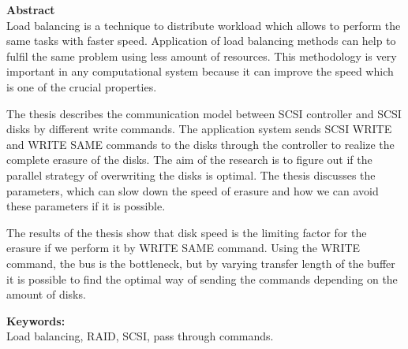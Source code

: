 {\bf Abstract}\\


Load balancing is a technique to distribute workload which allows to perform the same tasks with faster speed. Application of load balancing methods can help to fulfil the same problem using less amount of resources. This methodology is very important in any computational system because it can improve the speed which is one of the crucial properties. 

The thesis describes the communication model between SCSI controller and SCSI disks by different write commands. The application system sends SCSI WRITE and WRITE SAME commands to the disks through the controller to realize the complete erasure of the disks. The aim of the research is to figure out if the parallel strategy of overwriting the disks is optimal. The thesis discusses the parameters, which can slow down the speed of erasure and how we can avoid these parameters if it is possible.

The results of the thesis show that disk speed is the limiting factor for the erasure if we perform it by WRITE SAME command. Using the WRITE command, the bus is the bottleneck, but by varying transfer length of the buffer it is possible to find the optimal way of sending the commands depending on the amount of disks.





{\bf Keywords:}\\
Load balancing, RAID, SCSI, pass through commands.
